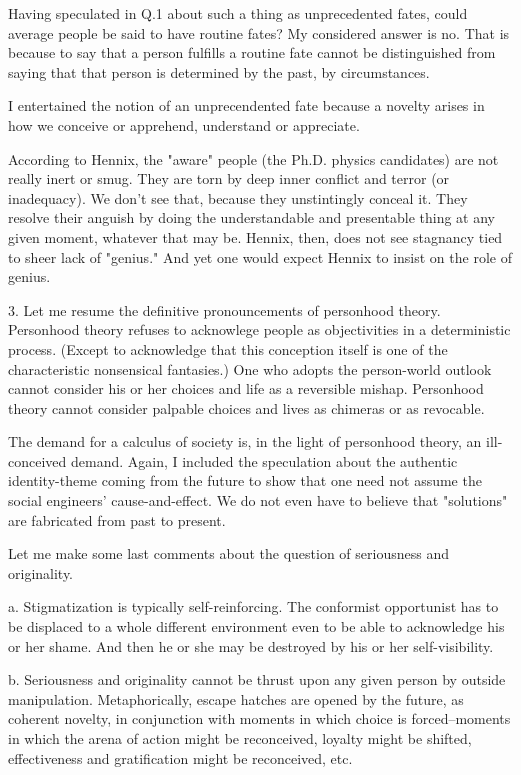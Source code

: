 Having speculated in Q.1 about such a thing as unprecedented fates, could average people be said to have routine fates? My considered answer is no. That is because to say that a person fulfills a routine fate cannot be distinguished from saying that that person is determined by the past, by circumstances.

I entertained the notion of an unprecendented fate because a novelty arises in how we conceive or apprehend, understand or appreciate.

According to Hennix, the "aware" people (the Ph.D. physics candidates) are not really inert or smug. They are torn by deep inner conflict and terror (or inadequacy). We don't see that, because they unstintingly conceal it. They resolve their anguish by doing the understandable and presentable thing at any given moment, whatever that may be. Hennix, then, does not see stagnancy tied to sheer lack of "genius." And yet one would expect Hennix to insist on the role of genius.

3. Let me resume the definitive pronouncements of personhood theory. Personhood theory refuses to acknowlege people as objectivities in a deterministic process. (Except to acknowledge that this conception itself is one of the characteristic nonsensical fantasies.) One who adopts the person-world outlook cannot consider his or her choices and life as a reversible mishap. Personhood theory cannot consider palpable choices and lives as chimeras or as revocable.

The demand for a calculus of society is, in the light of personhood theory, an ill-conceived demand. Again, I included the speculation about the authentic identity-theme coming from the future to show that one need not assume the social engineers' cause-and-effect. We do not even have to believe that "solutions" are fabricated from past to present.

Let me make some last comments about the question of seriousness and originality.

a. Stigmatization is typically self-reinforcing. The conformist opportunist has to be displaced to a whole different environment even to be able to acknowledge his or her shame. And then he or she may be destroyed by his or her self-visibility.

b. Seriousness and originality cannot be thrust upon any given person by outside manipulation. Metaphorically, escape hatches are opened by the future, as coherent novelty, in conjunction with moments in which choice is forced--moments in which the arena of action might be reconceived, loyalty might be shifted, effectiveness and gratification might be reconceived, etc. 